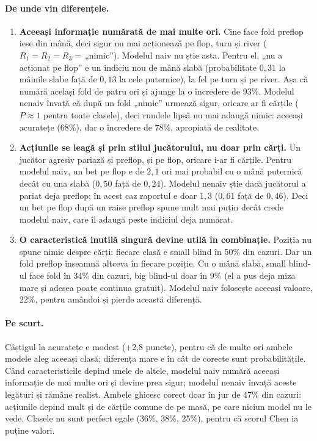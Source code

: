 \documentclass[10pt,a4paper]{article}
\begin{document}
\paragraph{De unde vin diferențele.}
\begin{enumerate}\setlength{\itemsep}{1pt}
\item \textbf{Aceeași informație numărată de mai multe ori.} Cine face fold
preflop iese din mână, deci sigur nu mai acționează pe flop, turn și river
($R_1=R_2=R_3=$\,„nimic''). Modelul naiv nu știe asta. Pentru el, „nu a acționat pe
flop'' e un indiciu nou de mână slabă (probabilitate $0{,}31$ la mâinile slabe
față de $0{,}13$ la cele puternice), la fel pe turn și pe river. Așa că
numără același fold de patru ori și ajunge la o încredere de 93\%. Modelul
nenaiv învață că după un fold „nimic'' urmează sigur, oricare ar fi cărțile
($P\approx1$ pentru toate clasele), deci rundele lipsă nu mai adaugă nimic:
aceeași acuratețe (68\%), dar o încredere de 78\%, apropiată de realitate.
\item \textbf{Acțiunile se leagă și prin stilul jucătorului, nu doar prin
cărți.} Un jucător agresiv pariază și preflop, și pe flop, oricare i-ar fi
cărțile. Pentru modelul naiv, un bet pe flop e de $2{,}1$ ori mai probabil cu o
mână puternică decât cu una slabă ($0{,}50$ față de $0{,}24$). Modelul nenaiv
știe dacă jucătorul a pariat deja preflop; în acest caz raportul e doar
$1{,}3$ ($0{,}61$ față de $0{,}46$). Deci un bet pe flop după un raise preflop
spune mult mai puțin decât crede modelul naiv, care îl adaugă peste indiciul
deja numărat.
\item \textbf{O caracteristică inutilă singură devine utilă în combinație.}
Poziția nu spune nimic despre cărți: fiecare clasă e small blind în 50\% din
cazuri. Dar un fold preflop înseamnă altceva în fiecare poziție. Cu o mână
slabă, small blind-ul face fold în 34\% din cazuri, big blind-ul doar în 9\%
(el a pus deja miza mare și adesea poate continua gratuit). Modelul naiv
folosește aceeași valoare, 22\%, pentru amândoi și pierde această diferență.
\end{enumerate}
\paragraph{Pe scurt.} Câștigul la acuratețe e modest (+2,8 puncte), pentru
că de multe ori ambele modele aleg aceeași clasă; diferența mare e în cât de
corecte sunt probabilitățile. Când caracteristicile depind unele de altele,
modelul naiv numără aceeași informație de mai multe ori și devine prea sigur;
modelul nenaiv învață aceste legături și rămâne realist. Ambele ghicesc corect
doar în jur de 47\% din cazuri: acțiunile depind mult și de cărțile comune de
pe masă, pe care niciun model nu le vede. Clasele nu sunt perfect egale (36\%,
38\%, 25\%), pentru că scorul Chen ia puține valori.
\end{document}
